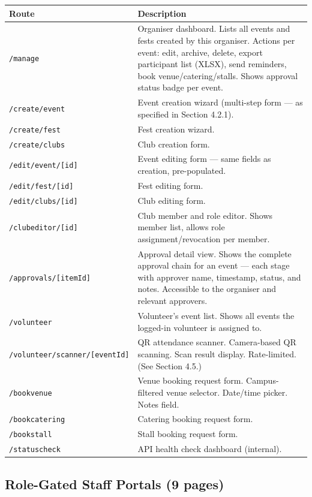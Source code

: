 \documentclass[12pt,a4paper]{article}
\begin{document}
\begin{tabularx}{\textwidth}{L{5cm} X}
\toprule
{}
\textbf{Route} & \textbf{Description} \\
\midrule
\texttt{/manage} & Organiser dashboard. Lists all events and fests created by this organiser. Actions per event: edit, archive, delete, export participant list (XLSX), send reminders, book venue/catering/stalls. Shows approval status badge per event. \\
\texttt{/create/event} & Event creation wizard (multi-step form — as specified in Section 4.2.1). \\
\texttt{/create/fest} & Fest creation wizard. \\
\texttt{/create/clubs} & Club creation form. \\
\texttt{/edit/event/[id]} & Event editing form — same fields as creation, pre-populated. \\
\texttt{/edit/fest/[id]} & Fest editing form. \\
\texttt{/edit/clubs/[id]} & Club editing form. \\
\texttt{/clubeditor/[id]} & Club member and role editor. Shows member list, allows role assignment/revocation per member. \\
\texttt{/approvals/[itemId]} & Approval detail view. Shows the complete approval chain for an event — each stage with approver name, timestamp, status, and notes. Accessible to the organiser and relevant approvers. \\
\texttt{/volunteer} & Volunteer's event list. Shows all events the logged-in volunteer is assigned to. \\
\texttt{/volunteer/scanner/[eventId]} & QR attendance scanner. Camera-based QR scanning. Scan result display. Rate-limited. (See Section 4.5.) \\
\texttt{/bookvenue} & Venue booking request form. Campus-filtered venue selector. Date/time picker. Notes field. \\
\texttt{/bookcatering} & Catering booking request form. \\
\texttt{/bookstall} & Stall booking request form. \\
\texttt{/statuscheck} & API health check dashboard (internal). \\
\bottomrule
\end{tabularx}

\subsection{Role-Gated Staff Portals (9 pages)}
\end{document}
